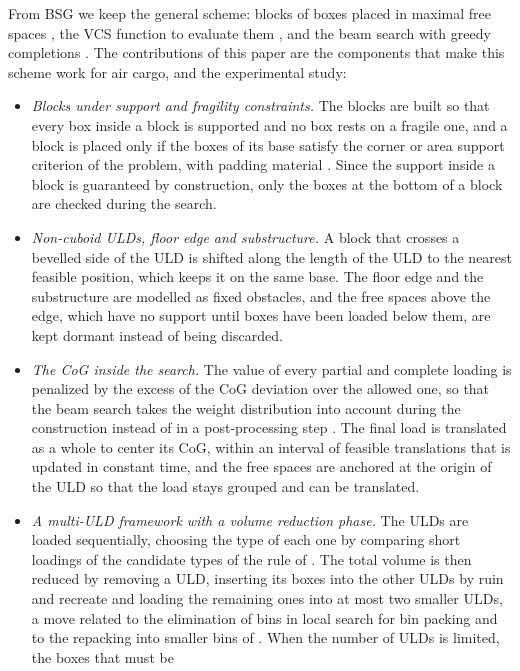 From BSG we keep the general scheme: blocks of boxes \citep{Fanslau2010} placed in maximal free
spaces \citep{Parreno2008}, the VCS function to evaluate them \citep{Araya2017}, and the beam
search with greedy completions \citep{Araya2014}. The contributions of this paper are the
components that make this scheme work for air cargo, and the experimental study:
\begin{itemize}
\item \emph{Blocks under support and fragility constraints.} The blocks are built so that every
	box inside a block is supported and no box rests on a fragile one, and a block is placed only
	if the boxes of its base satisfy the corner or area support criterion of the problem, with
	padding material \citep{Hessler2025}. Since the support inside a block is guaranteed by
	construction, only the boxes at the bottom of a block are checked during the search.
\item \emph{Non-cuboid ULDs, floor edge and substructure.} A block that crosses a bevelled side
	of the ULD is shifted along the length of the ULD to the nearest feasible position, which
	keeps it on the same base. The floor edge and the substructure are modelled as fixed
	obstacles, and the free spaces above the edge, which have no support until boxes have been
	loaded below them, are kept dormant instead of being discarded.
\item \emph{The CoG inside the search.} The value of every partial and complete loading is
	penalized by the excess of the CoG deviation over the allowed one, so that the beam search
	takes the weight distribution into account during the construction instead of in a
	post-processing step \citep{Davies1999,Paquay2018b}. The final load is translated as a whole
	to center its CoG, within an interval of feasible translations that is updated in constant
	time, and the free spaces are anchored at the origin of the ULD so that the load stays
	grouped and can be translated.
\item \emph{A multi-ULD framework with a volume reduction phase.} The ULDs are loaded
	sequentially, choosing the type of each one by comparing short loadings of the candidate
	types of the rule of \citet{Hessler2025}. The total volume is then reduced by removing a ULD,
	inserting its boxes into the other ULDs by ruin and recreate \citep{Schrimpf2000} and
	loading the remaining ones into at most two smaller ULDs, a move related to the elimination
	of bins in local search for bin packing \citep{Faroe2003} and to the repacking into smaller
	bins of \citet{Ortmann2010}. When the number of ULDs is limited, the boxes that must be

\end{itemize}
